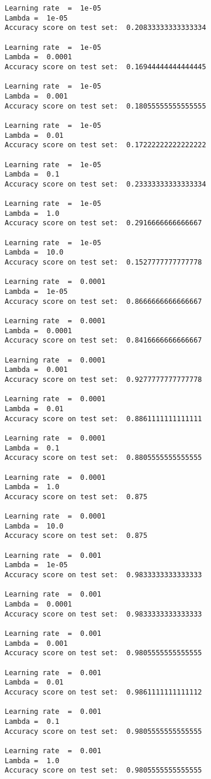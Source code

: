 \documentclass[11pt]{article}
\begin{document}
    \begin{Verbatim}[commandchars=\\\{\}]
Learning rate  =  1e-05
Lambda =  1e-05
Accuracy score on test set:  0.20833333333333334

Learning rate  =  1e-05
Lambda =  0.0001
Accuracy score on test set:  0.16944444444444445

Learning rate  =  1e-05
Lambda =  0.001
Accuracy score on test set:  0.18055555555555555

Learning rate  =  1e-05
Lambda =  0.01
Accuracy score on test set:  0.17222222222222222

Learning rate  =  1e-05
Lambda =  0.1
Accuracy score on test set:  0.23333333333333334

Learning rate  =  1e-05
Lambda =  1.0
Accuracy score on test set:  0.2916666666666667

Learning rate  =  1e-05
Lambda =  10.0
Accuracy score on test set:  0.1527777777777778

Learning rate  =  0.0001
Lambda =  1e-05
Accuracy score on test set:  0.8666666666666667

Learning rate  =  0.0001
Lambda =  0.0001
Accuracy score on test set:  0.8416666666666667

Learning rate  =  0.0001
Lambda =  0.001
Accuracy score on test set:  0.9277777777777778

Learning rate  =  0.0001
Lambda =  0.01
Accuracy score on test set:  0.8861111111111111

Learning rate  =  0.0001
Lambda =  0.1
Accuracy score on test set:  0.8805555555555555

Learning rate  =  0.0001
Lambda =  1.0
Accuracy score on test set:  0.875

Learning rate  =  0.0001
Lambda =  10.0
Accuracy score on test set:  0.875

Learning rate  =  0.001
Lambda =  1e-05
Accuracy score on test set:  0.9833333333333333

Learning rate  =  0.001
Lambda =  0.0001
Accuracy score on test set:  0.9833333333333333

Learning rate  =  0.001
Lambda =  0.001
Accuracy score on test set:  0.9805555555555555

Learning rate  =  0.001
Lambda =  0.01
Accuracy score on test set:  0.9861111111111112

Learning rate  =  0.001
Lambda =  0.1
Accuracy score on test set:  0.9805555555555555

Learning rate  =  0.001
Lambda =  1.0
Accuracy score on test set:  0.9805555555555555


\end{Verbatim}
\end{document}
